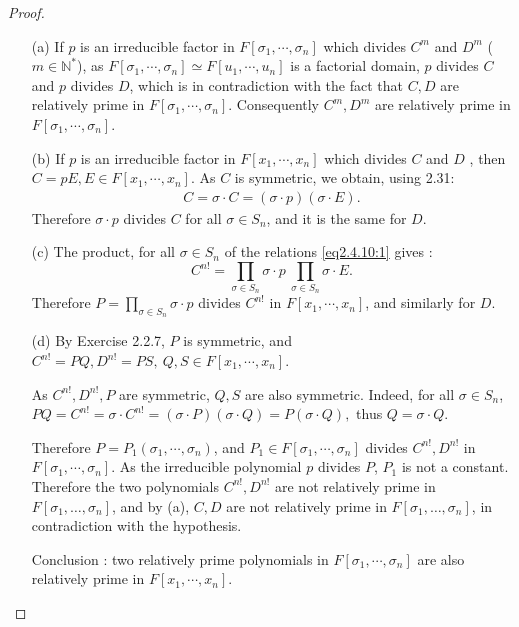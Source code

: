 \documentclass[11pt,a4paper]{article}
\begin{document}
\begin{proof}
\begin{enumerate}
\item[(a)]
If $p$ is an irreducible factor in $F[\sigma_1,\cdots,\sigma_n]$ which divides $C^m$ and $D^m$ ($m\in \mathbb{N}^*$), as $F[\sigma_1,\cdots,\sigma_n] \simeq F[u_1,\cdots,u_n]$ is a factorial domain, $p$ divides $C$ and $p$ divides $D$, which is in contradiction with the fact that $C,D$ are relatively prime in $F[\sigma_1,\cdots,\sigma_n]$. Consequently $C^m,D^m$ are relatively prime in $F[\sigma_1,\cdots,\sigma_n]$.


\item[(b)]
If $p$ is an irreducible factor in $F[x_1,\cdots,x_n]$ which divides $C$ and $D$ , then $C = p E, E \in F[x_1,\cdots,x_n]$.
As $C$ is symmetric, we obtain, using 2.31:
\begin{align}
C = \sigma\cdot C = (\sigma\cdot p) (\sigma\cdot E).\label{eq2.4.10:1}
\end{align}
Therefore $\sigma \cdot p$ divides $C$ for all $\sigma \in S_n$, and it is the same for $D$.


\item[(c)] The product, for all $\sigma \in S_n$ of the relations \eqref{eq2.4.10:1} gives :
$$C^{n!} =  \prod_{\sigma \in S_n} \sigma \cdot p \  \prod_{\sigma \in S_n} \sigma \cdot  E.$$
Therefore $P= \prod\limits_{\sigma \in S_n} \sigma \cdot  p$ divides  $C^{n!} $ in $F[x_1,\cdots,x_n]$, and similarly for $D$.


\item[(d)]
By Exercise 2.2.7, $P$ is symmetric, and $C^{n!} = P Q, D^{n!} = P S,\ Q,S \in F[x_1,\cdots,x_n]$.

As $C^{n!},D^{n!},P$ are symmetric, $Q,S$ are also symmetric. Indeed, for all $\sigma \in S_n$, 
$P Q = C^{n!} = \sigma \cdot C^{n!} = (\sigma \cdot P)( \sigma \cdot Q )= P (\sigma \cdot Q),$ thus $Q = \sigma\cdot Q$.

Therefore $P=P_1(\sigma_1,\cdots,\sigma_n)$, and $P_1 \in F[\sigma_1,\cdots,\sigma_n]$ divides $C^{n!},D^{n!}$ in $F[\sigma_1,\cdots,\sigma_n]$. As the irreducible polynomial  $p$ divides $P$, $P_1$ is not a constant. Therefore the two polynomials  $C^{n!},D^{n!}$ are not relatively prime in $F[\sigma_1,\ldots,\sigma_n]$, and by (a), $C,D$ are not relatively prime in $F[\sigma_1,\ldots,\sigma_n]$, in contradiction with the hypothesis.

Conclusion : two relatively prime polynomials in  $F[\sigma_1,\cdots,\sigma_n]$ are also relatively prime in  $F[x_1,\cdots,x_n]$.
\end{enumerate}
\end{proof}
\end{document}
